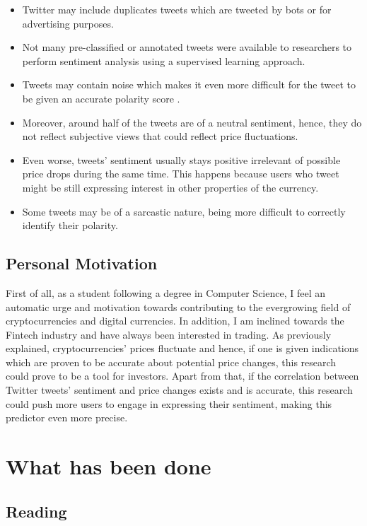 \documentclass{article}
\begin{document}
\begin{itemize}
\item Twitter may include duplicates tweets which are tweeted by bots or for advertising purposes\cite{sapp3}.
\item Not many pre-classified or annotated tweets were available to researchers to perform sentiment analysis using a supervised learning approach\cite{sapp2}.
\item Tweets may contain noise which makes it even more difficult for the tweet to be given an accurate polarity score \cite{sapp6}.
\item Moreover, around half of the tweets are of a neutral sentiment, hence, they do not reflect subjective views that could reflect price fluctuations\cite{sapp5}.
\item Even worse, tweets' sentiment usually stays positive irrelevant of possible price drops during the same time. This happens because users who tweet might be still expressing interest in other properties of the currency\cite{sapp5}.
\item Some tweets may be of a sarcastic nature, being more difficult to correctly identify their polarity\cite{semeval14}.
\end{itemize}


	\subsection{Personal Motivation}
	
	First of all, as a student following a degree in Computer Science, I feel an automatic urge and motivation towards contributing to the evergrowing field of cryptocurrencies and digital currencies. In addition, I am inclined towards the Fintech\cite{fintech} industry and have always been interested in trading. As previously explained, cryptocurrencies' prices fluctuate and hence, if one is given indications which are proven to be accurate about potential price changes, this research could prove to be a tool for investors. Apart from that, if the correlation between Twitter tweets' sentiment and price changes exists and is accurate, this research could push more users to engage in expressing their sentiment, making this predictor even more precise.
	
	\section{What has been done}
	
	\subsection{Reading}
	
\end{document}
